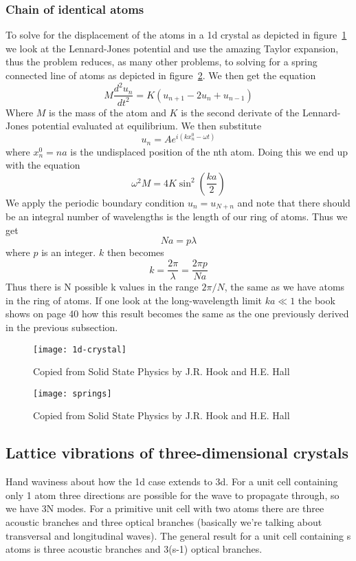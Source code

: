 \documentclass[11pt]{article}
\begin{document}
\subsubsection{Chain of identical atoms}
To solve for the displacement of the atoms in a 1d crystal as depicted in figure~\ref{fig:1d-crystal} we look at the Lennard-Jones potential and use the amazing Taylor expansion, thus the problem reduces, as many other problems, to solving for a spring connected line of atoms as depicted in figure~\ref{fig:springs}. We then get the equation 
\begin{equation}
	M \frac{d^2 u_n}{dt^2} = K(u_{n+1} - 2u_n + u_{n-1})
\end{equation}
Where $M$ is the mass of the atom and $K$ is the second derivate of the Lennard-Jones potential evaluated at equilibrium. We then substitute 
\begin{equation}
	u_n = A e^{i(kx^0_n - \omega t)}
\end{equation}
where $x^0_n = na$ is the undisplaced position of the nth atom. Doing this we end up with the equation 
\begin{equation}
	\omega^2 M = 4K \sin^2{(\frac{ka}{2})}
\end{equation}
We apply the periodic boundary condition $u_n =  u_{N+n}$ and note that there should be an integral number of wavelengths is the length of our ring of atoms. Thus we get
\begin{equation}
	Na = p\lambda
\end{equation}
where $p$ is an integer. $k$ then becomes 
\begin{equation}
	k = \frac{2 \pi}{\lambda} = \frac{2\pi p}{Na}
\end{equation}
Thus there is N possible k values in the range $2\pi/N$, the same as we have atoms in the ring of atoms. If one look at the long-wavelength limit $ka \ll 1$ the book shows on page 40 how this result becomes the same as the one previously derived in the previous subsection.
\begin{figure}[!ht]
	\centering
	\texttt{[image: 1d-crystal]}
	\caption{Copied from Solid State Physics by J.R. Hook and H.E. Hall}
	\label{fig:1d-crystal}
\end{figure}
\begin{figure}[!ht]
	\centering
	\texttt{[image: springs]}
	\caption{Copied from Solid State Physics by J.R. Hook and H.E. Hall}
	\label{fig:springs}
\end{figure}

\subsection{Lattice vibrations of three-dimensional crystals}
Hand waviness about how the 1d case extends to 3d. For a unit cell containing only 1 atom three directions are possible for the wave to propagate through, so we have 3N modes. For a primitive unit cell with two atoms there are three acoustic branches and three optical branches (basically we're talking about transversal and longitudinal waves). The general result for a unit cell containing s atoms is three acoustic branches and 3(s-1) optical branches.
\end{document}
